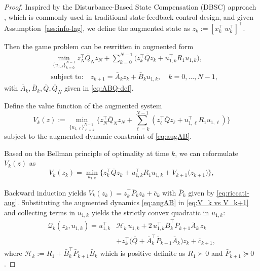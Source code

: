 \documentclass[letterpaper, 10 pt, conference]{ieeeconf}  %
\begin{document}
\begin{proof}
Inspired by the Disturbance-Based State Compensation (DBSC) approach \cite{rugh1996linear}, which is commonly used in traditional state-feedback control design, and given Assumption~\ref{ass:info-lag}, we define the augmented state as $z_k:=[x_k^\top\ w_k^\top]^\top$.

Then the game problem can be rewritten in augmented form
\begin{align}
&\min_{ \{ u_{1,k} \}_{k=0}^{N-1} } z_N^\top \bar Q_N z_N + \sum_{k=0}^{N-1}\!\big(z_k^\top \bar Q z_k + u_{1,k}^\top R_1 u_{1,k}\big), \label{eq:aug-cost}\\
& \text{subject to:} \quad z_{k+1}=\bar A_k z_k + \bar B_k u_{1,k}, \quad k =0,\dots, N-1,\label{eq:augAB}
\end{align}
with $\bar A_k,\bar B_k,\bar Q,\bar Q_N$ given in \eqref{eq:ABQ-def}.

Define the value function of the augmented system
\begin{equation}\label{eq:Vk}
V_k(z):=\min_{\{u_{1,\ell}\}_{\ell=k}^{N-1}}
\Big\{z_N^\top \bar Q_N z_N+\sum_{\ell=k}^{N-1}\!(z_\ell^\top \bar Q z_\ell + u_{1,\ell}^\top R_1 u_{1,\ell})\Big\}
\end{equation}
subject to the augmented dynamic constraint of \eqref{eq:augAB}.

Based on the Bellman principle of optimality at time $k$, we can reformulate $V_k(z)$ as
\begin{equation}
\label{eq:V_k vs V_k+1}
    V_k(z_k)=\min_{u_{1,k}}\Big\{ z_k^\top \bar{Q} z_k + u_{1,k}^\top R_1 u_{1,k} + V_{k+1}\big(z_{k+1}\big) \Big\},
\end{equation}

Backward induction yields $V_k(z_k)=z_k^\top \bar P_k z_k + \bar c_k$ with $\bar P_k$ given by \eqref{eq:riccati-aug}.
Substituting the augmented dynamics \eqref{eq:augAB} in \eqref{eq:V_k vs V_k+1} and collecting terms in $u_{1,k}$ yields the strictly convex quadratic in $u_{1,k}$:
\begin{equation}
\begin{aligned}
\mathcal Q_k(z_k,u_{1,k})
= u_{1,k}^\top &\mathcal H_k\, u_{1,k}
+ 2\,u_{1,k}^\top \bar B_k^\top \bar P_{k+1}\bar A_k\, z_k\\
&+ z_k^\top\!\big(\bar Q+\bar A_k^\top \bar P_{k+1}\bar A_k\big) z_k
+ \bar c_{k+1},
\end{aligned}
\end{equation}
where $\mathcal H_k:=R_1+\bar B_k^\top \bar P_{k+1}\bar B_k$ which is positive definite as $R_1\succ 0$ and $\bar P_{k+1}\succeq 0$.



\end{proof}
\end{document}
